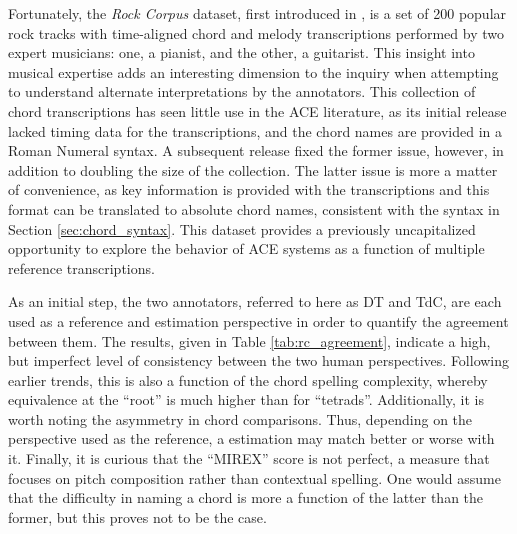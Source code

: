 Fortunately, the \emph{Rock Corpus} dataset, first introduced in \cite{deClerqc2010}, is a set of 200 popular rock tracks with time-aligned chord and melody transcriptions performed by two expert musicians:
one, a pianist, and the other, a guitarist.
This insight into musical expertise adds an interesting dimension to the inquiry when attempting to understand alternate interpretations by the annotators.
This collection of chord transcriptions has seen little use in the ACE literature, as its initial release lacked timing data for the transcriptions, and the chord names are provided in a Roman Numeral syntax.
A subsequent release fixed the former issue, however, in addition to doubling the size of the collection.
The latter issue is more a matter of convenience, as key information is provided with the transcriptions and this format can be translated to absolute chord names, consistent with the syntax in Section \ref{sec:chord_syntax}.
This dataset provides a previously uncapitalized opportunity to explore the behavior of ACE systems as a function of multiple reference transcriptions.




%

As an initial step, the two annotators, referred to here as DT and TdC, are each used as a reference and estimation perspective in order to quantify the agreement between them.
The results, given in Table \ref{tab:rc_agreement}, indicate a high, but imperfect level of consistency between the two human perspectives.
Following earlier trends, this is also a function of the chord spelling complexity, whereby equivalence at the ``root'' is much higher than for ``tetrads''.
Additionally, it is worth noting the asymmetry in chord comparisons.
Thus, depending on the perspective used as the reference, a estimation may match better or worse with it.
Finally, it is curious that the ``MIREX'' score is not perfect, a measure that focuses on pitch composition rather than contextual spelling.
One would assume that the difficulty in naming a chord is more a function of the latter than the former, but this proves not to be the case.

